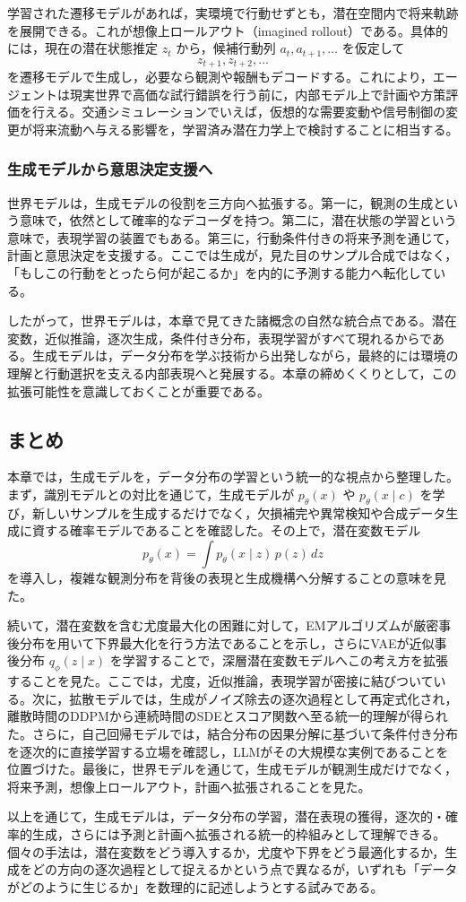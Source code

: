 学習された遷移モデルがあれば，実環境で行動せずとも，潜在空間内で将来軌跡を展開できる。これが想像上ロールアウト（imagined rollout）である。具体的には，現在の潜在状態推定 \(z_t\) から，候補行動列 \(a_t,a_{t+1},\dots\) を仮定して
\[
z_{t+1}, z_{t+2}, \dots
\]
を遷移モデルで生成し，必要なら観測や報酬もデコードする。これにより，エージェントは現実世界で高価な試行錯誤を行う前に，内部モデル上で計画や方策評価を行える。交通シミュレーションでいえば，仮想的な需要変動や信号制御の変更が将来流動へ与える影響を，学習済み潜在力学上で検討することに相当する。

\subsubsection{生成モデルから意思決定支援へ}

世界モデルは，生成モデルの役割を三方向へ拡張する。第一に，観測の生成という意味で，依然として確率的なデコーダを持つ。第二に，潜在状態の学習という意味で，表現学習の装置でもある。第三に，行動条件付きの将来予測を通じて，計画と意思決定を支援する。ここでは生成が，見た目のサンプル合成ではなく，「もしこの行動をとったら何が起こるか」を内的に予測する能力へ転化している。

したがって，世界モデルは，本章で見てきた諸概念の自然な統合点である。潜在変数，近似推論，逐次生成，条件付き分布，表現学習がすべて現れるからである。生成モデルは，データ分布を学ぶ技術から出発しながら，最終的には環境の理解と行動選択を支える内部表現へと発展する。本章の締めくくりとして，この拡張可能性を意識しておくことが重要である。

\subsection*{まとめ}

本章では，生成モデルを，データ分布の学習という統一的な視点から整理した。まず，識別モデルとの対比を通じて，生成モデルが \(p_{\theta}(x)\) や \(p_{\theta}(x \mid c)\) を学び，新しいサンプルを生成するだけでなく，欠損補完や異常検知や合成データ生成に資する確率モデルであることを確認した。その上で，潜在変数モデル
\[
p_{\theta}(x)=\int p_{\theta}(x \mid z)\,p(z)\,dz
\]
を導入し，複雑な観測分布を背後の表現と生成機構へ分解することの意味を見た。

続いて，潜在変数を含む尤度最大化の困難に対して，EMアルゴリズムが厳密事後分布を用いて下界最大化を行う方法であることを示し，さらにVAEが近似事後分布 \(q_{\phi}(z \mid x)\) を学習することで，深層潜在変数モデルへこの考え方を拡張することを見た。ここでは，尤度，近似推論，表現学習が密接に結びついている。次に，拡散モデルでは，生成がノイズ除去の逐次過程として再定式化され，離散時間のDDPMから連続時間のSDEとスコア関数へ至る統一的理解が得られた。さらに，自己回帰モデルでは，結合分布の因果分解に基づいて条件付き分布を逐次的に直接学習する立場を確認し，LLMがその大規模な実例であることを位置づけた。最後に，世界モデルを通じて，生成モデルが観測生成だけでなく，将来予測，想像上ロールアウト，計画へ拡張されることを見た。

以上を通じて，生成モデルは，データ分布の学習，潜在表現の獲得，逐次的・確率的生成，さらには予測と計画へ拡張される統一的枠組みとして理解できる。個々の手法は，潜在変数をどう導入するか，尤度や下界をどう最適化するか，生成をどの方向の逐次過程として捉えるかという点で異なるが，いずれも「データがどのように生じるか」を数理的に記述しようとする試みである。
